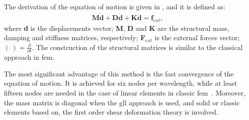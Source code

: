 The derivation of the equation of motion is given in \cite{ostachowicz2011guided}, and it is defined as:
\begin{eqnarray}
	\label{eq:motion}
	\textbf{M} \ddot{\textbf{d}} + \textbf{D} \dot{\textbf{d}} + \textbf{K} \textbf{d} = \textbf{f}_{ext},
\end{eqnarray}
%
%
%
%
%
where \textbf{d} is the displacements vector; \textbf{M}, \textbf{D} and \textbf{K} are the structural mass, damping and stiffness matrices, respectively; \textbf{F}$_{ext}$ is the external forces vector; \((\dot{\ })=\frac{\partial}{\partial t}\).
The construction of the structural matrices is similar to the classical approach in \ac{fem}.

The most significant advantage of this method is the fast convergence of the equation of motion.
It is achieved for six nodes per wavelength, while at least fifteen nodes are needed in the case of linear elements in classic \ac{fem}~\cite{wee2017simulating}.
Moreover, the mass matrix is diagonal when the \ac{gll} approach is used, and solid or classic elements based on, the first order shear deformation theory is involved.
